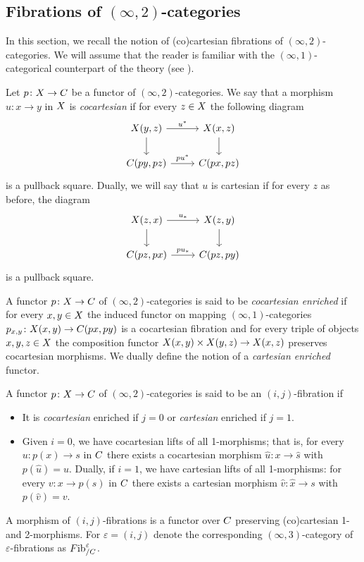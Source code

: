 \documentclass[a4paper,reqno,twoside]{amsart}
\begin{document}
\subsection{Fibrations of $(\infty,2)$-categories}
In this section, we recall the notion of (co)cartesian fibrations of $(\infty,2)$-categories. We will assume that the reader is familiar with the $(\infty,1)$-categorical counterpart of the theory (see \cite[Section 2.4]{HTT}).
\begin{definition}
	Let $p \colon \relax{X} \to \relax{C}$ be a functor of $(\infty,2)$-categories. We say that a morphism $u \colon x \to y$ in $\relax{X}$ is \emph{cocartesian} if for every $z \in \relax{X}$ the following diagram
	\[
		\begin{tikzcd}
		\cX(y,z) \arrow[r,"u^*"] \arrow[d]  & \cX(x,z) \arrow[d] \\
		\cC(py,pz) \arrow[r,"pu^*"] & \cC(px,pz)
	\end{tikzcd}
	\]
	is a pullback square. Dually, we will say that $u$ is cartesian if for every $z$ as before, the diagram
	\[
		\begin{tikzcd}
		\cX(z,x) \arrow[r,"u_*"] \arrow[d]  & \cX(z,y) \arrow[d] \\
		\cC(pz,px) \arrow[r,"pu_*"] & \cC(pz,py)
	\end{tikzcd}
	\]
	is a pullback square.
\end{definition}

\begin{definition}
	A functor $p\colon \relax{X} \to \relax{C}$ of $(\infty,2)$-categories is said to be \emph{cocartesian enriched} if for every $x,y \in \relax{X}$ the induced functor on mapping $(\infty,1)$-categories $p_{x,y} \colon \relax{X}(x,y) \to \relax{C}(px,py)$ is a cocartesian fibration and for every triple of objects $x,y,z\in \relax{X}$ the composition functor $\relax{X}(x,y)\times \relax{X}(y,z)\to \relax{X}(x,z)$ preserves cocartesian morphisms. We dually define the notion of a \emph{cartesian enriched} functor.
\end{definition}





\begin{definition}
	A functor $p \colon \relax{X} \to \relax{C}$ of $(\infty,2)$-categories is said to be an $(i,j)$-fibration if
	\begin{itemize}
		\item[$(i)$] It is \emph{cocartesian} enriched if $j=0$ or \emph{cartesian} enriched if $j=1$.
		\item[$(ii)$] Given $i=0$, we have cocartesian lifts of all 1-morphisms; that is, for every $u \colon p(x)\to s$ in $\relax{C}$ there exists a cocartesian morphism $\hat{u}\colon x \to \hat{s}$ with $p(\hat{u})=u$. Dually, if $i=1$, we have cartesian lifts of all 1-morphisms: for every $v \colon x\to p(s)$ in $\relax{C}$ there exists a cartesian morphism $\hat{v}\colon \hat{x} \to s$ with $p(\hat{v})=v$.
	\end{itemize}
	A morphism of $(i,j)$-fibrations is a functor over $\relax{C}$ preserving (co)cartesian 1- and 2-morphisms. For $\varepsilon=(i,j)$ denote the corresponding $(\infty,3)$-category of $\varepsilon$-fibrations as $\relax{F}\mathrm{ib}^{\varepsilon}_{/\relax{C}}$.
\end{definition}
\end{document}
